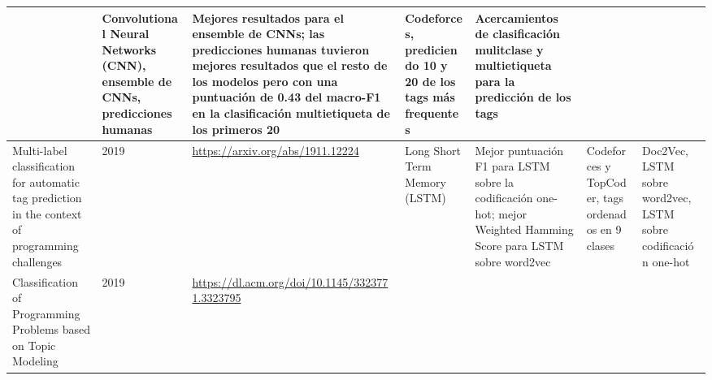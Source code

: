 \documentclass{article}
\begin{document}
\begin{itemize}
\begin{longtable}{|p{2cm}|p{0.8cm}|p{2cm}|p{2cm}|p{3cm}|p{2cm}|p{3cm}|}
              
                             & Convolutional Neural Networks (CNN), ensemble de CNNs, predicciones humanas
                             & Mejores resultados para el ensemble de CNNs; las predicciones humanas tuvieron mejores resultados que el resto de los modelos pero con una puntuación de 0.43 del macro-F1 en la clasificación multietiqueta de los primeros 20 
                             & Codeforces, prediciendo 10 y 20 de los tags más frequentes
                             & Acercamientos de clasificación mulitclase y multietiqueta para la predicción de los tags                                                                                                                                                                       \\
              
              \hline
              Multi-label classification for automatic tag prediction in the context of programming challenges
                             & 2019
                             & \href{https://arxiv.org/abs/1911.12224}{\url{https://arxiv.org/abs/1911.12224}}

              
              
              
              
              
              
                             & Long Short Term Memory (LSTM)
                             & Mejor puntuación F1 para LSTM sobre la codificación one-hot; mejor Weighted Hamming Score para LSTM sobre word2vec
                             & Codeforces y TopCoder, tags ordenados en 9 clases
                             & Doc2Vec, LSTM sobre word2vec, LSTM sobre codificación one-hot                                                                                                                                                                                                \\
              
              \hline
              Classification of Programming Problems based on Topic Modeling
                             & 2019
                             & \href{https://dl.acm.org/doi/10.1145/3323771.3323795}{\url{https://dl.acm.org/doi/10.1145/3323771.3323795}}

              
              
              
              
              
              

\end{longtable}
\end{itemize}
\end{document}
